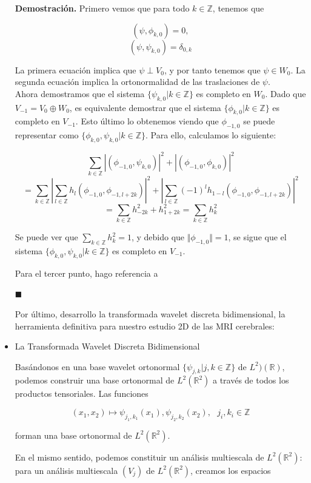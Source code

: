 \begin{itemize}
\textbf{Demostración.} Primero vemos que para todo $k \in \mathbb{Z}$, tenemos que

$$(\psi, \phi_{k,0}) = 0,$$
$$(\psi, \psi_{k,0}) = \delta_{0,k}$$

La primera ecuación implica que $\psi \perp V_0$, y por tanto tenemos que $\psi \in W_0$. La segunda ecuación implica la ortonormalidad de las traslaciones de $\psi$. \\

Ahora demostramos que el sistema $\{\psi_{k,0} | k \in \mathbb{Z} \}$ es completo en $W_0$. Dado que $V_{-1} = V_0 \oplus W_0$, es equivalente demostrar que el sistema $\{\phi_{k,0} | k \in \mathbb{Z} \}$ es completo en $V_{-1}$. Esto último lo obtenemos viendo que $\phi_{-1,0}$ se puede representar como $\{\phi_{k,0}, \psi_{k,0} | k \in \mathbb{Z} \}$. Para ello, calculamos lo siguiente:

$$\sum_{k \in \mathbb{Z}} | (\phi_{-1,0}, \psi_{k,0})|^2 +  | (\phi_{-1,0}, \phi_{k,0})|^2$$
$$= \sum_{k \in \mathbb{Z}}| \sum_{l \in \mathbb{Z}} h_l (\phi_{-1,0},\phi_{-1,l+2k}) |^2 + | \sum_{l \in \mathbb{Z}}(-1)^l h_{1-l} (\phi_{-1,0},\phi_{-1,l+2k}) |^2$$
$$= \sum_{k \in \mathbb{Z}} h_{-2k}^2 + h_{1+2k}^2 = \sum_{k \in \mathbb{Z}}h_k^2$$

Se puede ver que $\sum_{k \in \mathbb{Z}} h_k^2 = 1$, y debido que $\Vert \phi_{-1,0} \Vert = 1$, se sigue que el sistema $\{\phi_{k,0}, \psi_{k,0} | k \in \mathbb{Z} \}$ es completo en $V_{-1}$.

Para el tercer punto, hago referencia a \cite{meyer}


\hfill$\blacksquare$

Por último, desarrollo la transformada wavelet discreta bidimensional, la herramienta definitiva para nuestro estudio 2D de las MRI cerebrales:

\item La Transformada Wavelet Discreta Bidimensional

Basándonos en una base wavelet ortonormal $\{\psi_{j,k} | j,k \in \mathbb{Z} \}$ de $L^2)(\mathbb{R})$, podemos construir una base ortonormal de $L^2(\mathbb{R}^2)$ a través de todos los productos tensoriales. Las funciones

$$(x_1,x_2) \mapsto \psi_{j_1,k_1}(x_1), \psi_{j_2,k_2}(x_2), \ \ \  j_i,k_i \in \mathbb{Z}$$

forman una base ortonormal de $L^2(\mathbb{R}^2)$.

En el mismo sentido, podemos constituir un análisis multiescala de $L^2(\mathbb{R}^2)$: para un análisis multiescala $(V_j)$ de $L^2(\mathbb{R}^2)$, creamos los espacios


\end{itemize}
